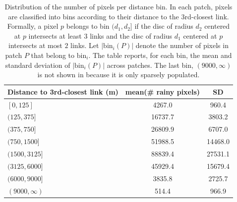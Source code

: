 \documentclass[11pt]{article}
\begin{document}
\begin{table}[H]
  \centering
    \begin{tabular}{l
                  S[table-format=5.1]
                  S[table-format=5.1]}
    \toprule
    {Distance to 3rd-closest link (m)} & {mean(\# rainy pixels)} & {SD} \\
    \midrule
    $[0,125]$      &  4267.0 &   960.4 \\
    $(125,375]$     & 16737.7 &  3803.2 \\
    $(375,750]$     & 26809.9 &  6707.0 \\
    $(750,1500]$    & 51988.5 & 14468.0 \\
    $(1500,3125]$   & 88839.4 & 27531.1 \\
    $(3125,6000]$   & 45929.4 & 15679.4 \\
    $(6000,9000]$   &  3835.8 &  2725.7 \\
    $(9000,\infty)$         &   514.4 &   966.9 \\
    \bottomrule
  \end{tabular}
  \caption{Distribution of the number of pixels per distance bin. In each patch, pixels are classified into bins according to their distance to the 3rd-closest link. Formally, a pixel $p$ belongs to bin $(d_1,d_2]$ if the disc of radius $d_2$ centered at $p$ intersects at least $3$ links and the disc of radius $d_1$ centered at $p$ intersects at most $2$ links. Let $|\mathrm{bin}_i(P)|$ denote the number of pixels in patch $P$ that belong to $\mathrm{bin}_i$. The table reports, for each bin, the mean and standard deviation of $|\mathrm{bin}_i(P)|$ across patches. The last bin, 
$(9000,\infty)$ is not shown in  because it is only sparsely populated.}
\end{table}
\end{document}
